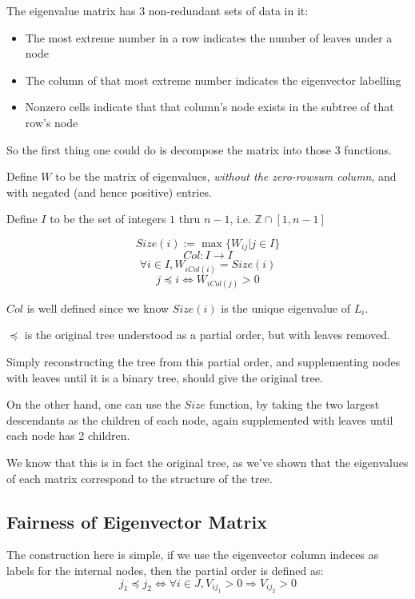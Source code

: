 \documentclass{report}
\begin{document}
The eigenvalue matrix has 3 non-redundant sets of data in it:
\begin{itemize}
	\item The most extreme number in a row indicates the number of leaves under
		a node
	\item The column of that most extreme number indicates the eigenvector
		labelling
	\item Nonzero cells indicate that that column's node exists in the subtree
		of that row's node
\end{itemize}

So the first thing one could do is decompose the matrix into those 3 functions.

Define $W$ to be the matrix of eigenvalues, \emph{without the zero-rowsum
column}, and with negated (and hence positive) entries.

Define $I$ to be the set of integers $1$ thru $n-1$, i.e. $\mathds{Z} \cap [1,
n-1]$

\[\mathit{Size}(i) := \max\{W_{ij} | j \in I\}\]
\[\mathit{Col}: I \rightarrow I\]
\[\forall i \in I, W_{i \mathit{Col}(i)} = \mathit{Size}(i)\]
\[j \preccurlyeq i \Leftrightarrow W_{i \mathit{Col}(j)} > 0\]

$\mathit{Col}$ is well defined since we know $\mathit{Size}(i)$ is the unique
eigenvalue of $L_i$.

$\preccurlyeq$ is the original tree understood as a partial order, but with
leaves removed.

Simply reconstructing the tree from this partial order, and supplementing nodes
with leaves until it is a binary tree, should give the original tree.

On the other hand, one can use the $\mathit{Size}$ function, by taking the two
largest descendants as the children of each node, again supplemented with
leaves until each node has 2 children.

We know that this is in fact the original tree, as we've shown that the
eigenvalues of each matrix correspond to the structure of the tree.

\subsection{Fairness of Eigenvector Matrix}

The construction here is simple, if we use the eigenvector column indeces as
labels for the internal nodes, then the partial order is defined as:
\[j_1 \preccurlyeq j_2 \Leftrightarrow \forall i \in J, V_{ij_1} > 0
\Rightarrow V_{ij_2} > 0 \]
\end{document}
